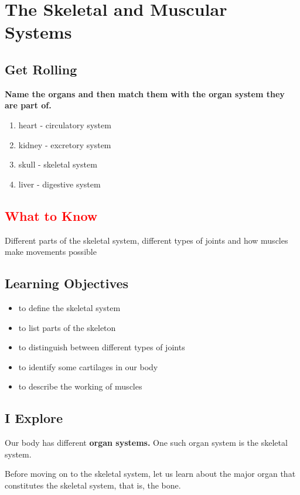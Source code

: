 \chapter{The Skeletal and Muscular Systems}
\section{Get Rolling}
\textbf{Name the organs and then match them with the organ system they are part of.}
\begin{enumerate}
    \item heart - circulatory system
    \item kidney - excretory system
    \item skull - skeletal system
    \item liver - digestive system 
\end{enumerate}
\section{\textcolor{red}{What to Know}}
Different parts of the skeletal system, different types of joints and how muscles make movements possible
\section{\textbf{Learning Objectives}}
\begin{itemize}
    \item to define the skeletal system
    \item to list parts of the skeleton
    \item to distinguish between different types of joints
    \item to identify some cartilages in our body
    \item to describe the working of muscles
\end{itemize}
\section{I Explore}
Our body has different \textbf{organ systems.} One such organ system is the skeletal system.
\vspace{0.1in}
\par
Before moving on to the skeletal system, let us learn about the major organ that constitutes the skeletal system, that is, the bone.
